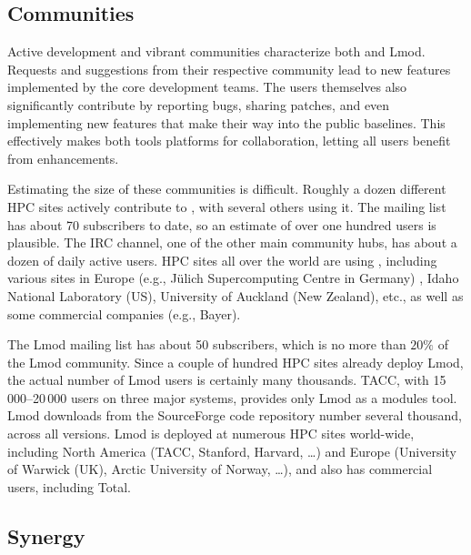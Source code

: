 
\subsection{Communities}
\label{sec:communities}

Active development and vibrant communities characterize both \easybuild{} and Lmod.
Requests and suggestions from their respective community lead to new features
implemented by the core development teams. The users themselves also significantly
contribute by reporting bugs, sharing patches, and even implementing new features that
make their way into the public baselines. This effectively makes both tools
platforms for collaboration, letting all users benefit from enhancements.

Estimating the size of these communities is difficult. Roughly a dozen different HPC
sites actively contribute to \easybuild{}, with several others using it.
The \easybuild{} mailing list has about 70 subscribers to date, so an
estimate of over one hundred users is plausible. The \easybuild{} IRC channel, one of
the other main community hubs, has about a dozen of daily active users. HPC sites all
over the world are using \easybuild{}, including various sites in Europe
(e.g., J\"ulich Supercomputing Centre in Germany)
 ,
Idaho National Laboratory (US),
University of Auckland (New Zealand), etc., as well as some commercial companies
(e.g., Bayer).

The Lmod mailing list has about 50 subscribers, which is no more than $20\%$ of the
Lmod community. Since a couple of hundred HPC sites already deploy Lmod, the actual
number of Lmod users is certainly many thousands. TACC, with 15\,000--20\,000
users on three major systems, provides only Lmod as a modules tool. Lmod downloads
from the SourceForge code repository number several thousand, across all versions.
Lmod is deployed at numerous HPC sites world-wide, including North America (TACC,
Stanford, Harvard, \ldots) and Europe (University of Warwick (UK),
Arctic University of Norway, \ldots), and also has commercial users, including Total.

\subsection{Synergy}

